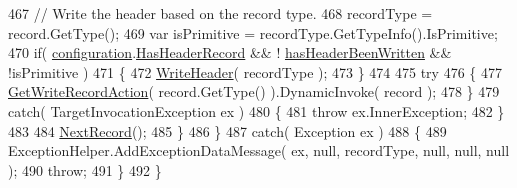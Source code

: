 \begin{DoxyCode}
467                     \textcolor{comment}{// Write the header based on the record type.}
468                     recordType = record.GetType();
469                     var isPrimitive = recordType.GetTypeInfo().IsPrimitive;
470                     \textcolor{keywordflow}{if}( \hyperlink{a00059_a0711748c9a399cfbcbad93857304fc67}{configuration}.\hyperlink{a00041_a9e439f90bfac500d24d6e2e731240439}{HasHeaderRecord} && !
      \hyperlink{a00059_a48b53b7f4428286805b1eaac1055b2bf}{hasHeaderBeenWritten} && !isPrimitive )
471                     \{
472                         \hyperlink{a00059_af2298dcd2934550fd9dd592921f18541}{WriteHeader}( recordType );
473                     \}
474 
475                     \textcolor{keywordflow}{try}
476                     \{
477                         \hyperlink{a00059_a1ab2b602b050ceb6f0a0874504ddf3f3}{GetWriteRecordAction}( record.GetType() ).DynamicInvoke( record 
      );
478                     \}
479                     \textcolor{keywordflow}{catch}( TargetInvocationException ex )
480                     \{
481                         \textcolor{keywordflow}{throw} ex.InnerException;
482                     \}
483 
484                     \hyperlink{a00059_a397af8c87002d3b9c2b5152c6981d4d2}{NextRecord}();
485                 \}
486             \}
487             \textcolor{keywordflow}{catch}( Exception ex )
488             \{
489                 ExceptionHelper.AddExceptionDataMessage( ex, null, recordType, null, null, null );
490                 \textcolor{keywordflow}{throw};
491             \}
492         \}
\end{DoxyCode}


